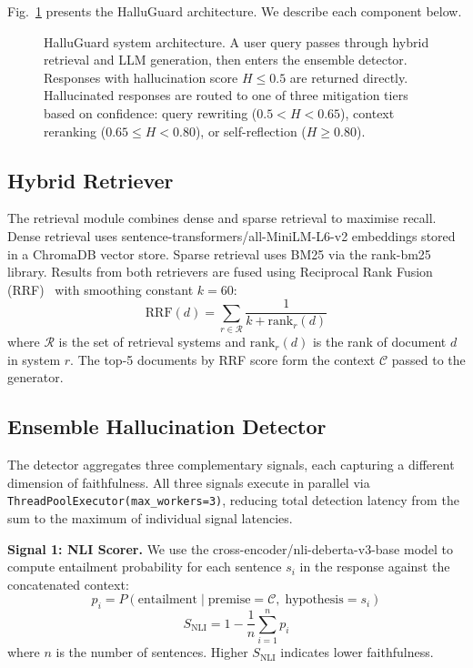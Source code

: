 \documentclass[conference]{IEEEtran}
\begin{document}
Fig.~\ref{fig:architecture} presents the HalluGuard architecture. We describe each component below.

\begin{figure}[t]
\centering

\caption{HalluGuard system architecture. A user query passes through hybrid retrieval and LLM generation, then enters the ensemble detector. Responses with hallucination score $H \leq 0.5$ are returned directly. Hallucinated responses are routed to one of three mitigation tiers based on confidence: query rewriting ($0.5 < H < 0.65$), context reranking ($0.65 \leq H < 0.80$), or self-reflection ($H \geq 0.80$).}
\label{fig:architecture}
\end{figure}

\subsection{Hybrid Retriever}

The retrieval module combines dense and sparse retrieval to maximise recall. Dense retrieval uses sentence-transformers/all-MiniLM-L6-v2 embeddings stored in a ChromaDB vector store. Sparse retrieval uses BM25 via the rank-bm25 library. Results from both retrievers are fused using Reciprocal Rank Fusion (RRF)~\cite{lewis2020rag} with smoothing constant $k = 60$:
\begin{equation}
\text{RRF}(d) = \sum_{r \in \mathcal{R}} \frac{1}{k + \text{rank}_r(d)}
\label{eq:rrf}
\end{equation}
where $\mathcal{R}$ is the set of retrieval systems and $\text{rank}_r(d)$ is the rank of document $d$ in system $r$. The top-5 documents by RRF score form the context $\mathcal{C}$ passed to the generator.

\subsection{Ensemble Hallucination Detector}

The detector aggregates three complementary signals, each capturing a different dimension of faithfulness. All three signals execute in parallel via \texttt{ThreadPoolExecutor(max\_workers=3)}, reducing total detection latency from the sum to the maximum of individual signal latencies.

\medskip
\noindent\textbf{Signal 1: NLI Scorer.} We use the cross-encoder/nli-deberta-v3-base model to compute entailment probability for each sentence $s_i$ in the response against the concatenated context:
\begin{equation}
p_i = P(\text{entailment} \mid \text{premise}=\mathcal{C},\; \text{hypothesis}=s_i)
\end{equation}
\begin{equation}
S_{\text{NLI}} = 1 - \frac{1}{n}\sum_{i=1}^{n} p_i
\label{eq:nli}
\end{equation}
where $n$ is the number of sentences. Higher $S_{\text{NLI}}$ indicates lower faithfulness.
\end{document}
